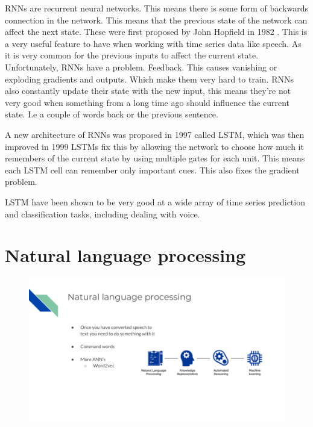 \documentclass[10pt]{article}
\begin{document}
        RNNs are recurrent neural networks. This means there is some form of backwards connection in the network.  This means that the previous state of the network can affect the next state.  These were first proposed by John Hopfield in 1982 \cite{hopfeild}. This is a very useful feature to have when working with time series data like speech. As it is very common for the previous inputs to affect the current state.
        Unfortunately, RNNs have a problem. Feedback. This causes vanishing or exploding gradients and outputs. Which make them very hard to train. RNNs also constantly update their state with the new input, this means they're not very good when something from a long time ago should influence the current state. I.e a couple of words back or the previous sentence. 

        A new architecture of RNNs was proposed in 1997\cite{lstm} called LSTM, which was then improved in 1999\cite{forget}
        LSTMs fix this by allowing the network to choose how much it remembers of the current state by using multiple gates for each unit. This means each LSTM cell can remember only important cues. This also fixes the gradient problem.
        
        LSTM have been shown to be very good at a wide array of time series prediction and classification tasks, including dealing with voice.

        \newpage

    \section*{Natural language processing}
	    
	    \begin{figure}[H]
            \centering
            \includegraphics[width=1\textwidth]{slide_5}
            \label{fig:appendix:slide_5}
        \end{figure}
\end{document}
